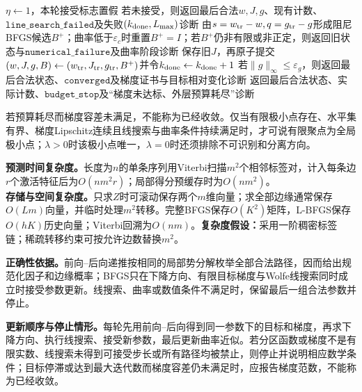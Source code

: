 \begin{AlgorithmContract}
\begin{algorithm}[H]
{  $\eta\leftarrow1$，本轮接受标志置假\;
  若未接受，则返回最后合法$w,J,g$、现有计数、$\mathtt{line\_search\_failed}$及失败$(k_{\rm done},L_{\max})$诊断\;
  \label{struct:V3-C06-CH23}
  由$s=w_{\rm tr}-w,q=g_{\rm tr}-g$形成阻尼BFGS候选$B^+$；曲率低于$\varepsilon_c$时重置$B^+=I$；若$B^+$仍非有限或非正定，则返回旧状态与$\mathtt{numerical\_failure}$及曲率阶段诊断\;
  保存旧$J$，再原子提交$(w,J,g,B)\leftarrow(w_{\rm tr},J_{\rm tr},g_{\rm tr},B^+)$并令$k_{\rm done}\leftarrow k_{\rm done}+1$\;
  \label{struct:V3-C06-CH24}
  若$\|g\|_\infty\le\varepsilon_g$，则返回最后合法状态、$\mathtt{converged}$及梯度证书与目标相对变化诊断\;
}
\label{struct:V3-C06-CH25}
返回最后合法状态、实际计数、$\mathtt{budget\_stop}$及“梯度未达标、外层预算耗尽”诊断\;
\end{algorithm}
\end{AlgorithmContract}

若预算耗尽而梯度容差未满足，不能称为已经收敛。仅当有限极小点存在、水平集有界、梯度Lipschitz连续且线搜索与曲率条件持续满足时，才可说有限聚点为全局极小点；$\lambda>0$时该极小点唯一，$\lambda=0$时还须排除不可识别和分离方向。

\label{struct:V3-C06-CH27}
\textbf{预测时间复杂度。}长度为$n$的单条序列用Viterbi扫描$m^2$个相邻标签对，计入每条边$r$个激活特征后为$O(nm^2r)$；局部得分预缓存时为$O(nm^2)$。\\
\textbf{存储与空间复杂度。}只求$Z$时可滚动保存两个$m$维向量；求全部边缘通常保存$O(Lm)$向量，并临时处理$m^2$转移。完整BFGS保存$O(K^2)$矩阵，L-BFGS保存$O(hK)$历史向量；Viterbi回溯为$O(nm)$。\textbf{复杂度假设：}采用一阶稠密标签链；稀疏转移约束可按允许边数替换$m^2$。

\textbf{正确性依据。}前向--后向递推按相同的局部势分解枚举全部合法路径，因而给出规范化因子和边缘概率；BFGS只在下降方向、有限目标梯度与Wolfe线搜索同时成立时接受参数更新。线搜索、曲率或数值条件不满足时，保留最后一组合法参数并停止。

\textbf{更新顺序与停止情形。}每轮先用前向--后向得到同一参数下的目标和梯度，再求下降方向、执行线搜索、接受新参数，最后更新曲率近似。若分区函数或梯度不是有限实数、线搜索未得到可接受步长或所有路径均被禁止，则停止并说明相应数学条件；目标停滞或达到最大迭代数而梯度容差仍未满足时，应报告梯度范数，不能称为已经收敛。


